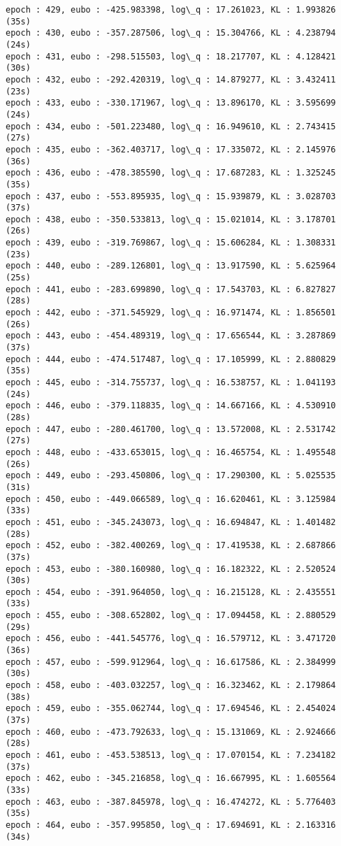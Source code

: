 \documentclass[11pt]{article}
\begin{document}
\begin{Verbatim}[commandchars=\\\{\}]
epoch : 429, eubo : -425.983398, log\_q : 17.261023, KL : 1.993826 (35s)
epoch : 430, eubo : -357.287506, log\_q : 15.304766, KL : 4.238794 (24s)
epoch : 431, eubo : -298.515503, log\_q : 18.217707, KL : 4.128421 (30s)
epoch : 432, eubo : -292.420319, log\_q : 14.879277, KL : 3.432411 (23s)
epoch : 433, eubo : -330.171967, log\_q : 13.896170, KL : 3.595699 (24s)
epoch : 434, eubo : -501.223480, log\_q : 16.949610, KL : 2.743415 (27s)
epoch : 435, eubo : -362.403717, log\_q : 17.335072, KL : 2.145976 (36s)
epoch : 436, eubo : -478.385590, log\_q : 17.687283, KL : 1.325245 (35s)
epoch : 437, eubo : -553.895935, log\_q : 15.939879, KL : 3.028703 (37s)
epoch : 438, eubo : -350.533813, log\_q : 15.021014, KL : 3.178701 (26s)
epoch : 439, eubo : -319.769867, log\_q : 15.606284, KL : 1.308331 (23s)
epoch : 440, eubo : -289.126801, log\_q : 13.917590, KL : 5.625964 (25s)
epoch : 441, eubo : -283.699890, log\_q : 17.543703, KL : 6.827827 (28s)
epoch : 442, eubo : -371.545929, log\_q : 16.971474, KL : 1.856501 (26s)
epoch : 443, eubo : -454.489319, log\_q : 17.656544, KL : 3.287869 (37s)
epoch : 444, eubo : -474.517487, log\_q : 17.105999, KL : 2.880829 (35s)
epoch : 445, eubo : -314.755737, log\_q : 16.538757, KL : 1.041193 (24s)
epoch : 446, eubo : -379.118835, log\_q : 14.667166, KL : 4.530910 (28s)
epoch : 447, eubo : -280.461700, log\_q : 13.572008, KL : 2.531742 (27s)
epoch : 448, eubo : -433.653015, log\_q : 16.465754, KL : 1.495548 (26s)
epoch : 449, eubo : -293.450806, log\_q : 17.290300, KL : 5.025535 (31s)
epoch : 450, eubo : -449.066589, log\_q : 16.620461, KL : 3.125984 (33s)
epoch : 451, eubo : -345.243073, log\_q : 16.694847, KL : 1.401482 (28s)
epoch : 452, eubo : -382.400269, log\_q : 17.419538, KL : 2.687866 (37s)
epoch : 453, eubo : -380.160980, log\_q : 16.182322, KL : 2.520524 (30s)
epoch : 454, eubo : -391.964050, log\_q : 16.215128, KL : 2.435551 (33s)
epoch : 455, eubo : -308.652802, log\_q : 17.094458, KL : 2.880529 (29s)
epoch : 456, eubo : -441.545776, log\_q : 16.579712, KL : 3.471720 (36s)
epoch : 457, eubo : -599.912964, log\_q : 16.617586, KL : 2.384999 (30s)
epoch : 458, eubo : -403.032257, log\_q : 16.323462, KL : 2.179864 (38s)
epoch : 459, eubo : -355.062744, log\_q : 17.694546, KL : 2.454024 (37s)
epoch : 460, eubo : -473.792633, log\_q : 15.131069, KL : 2.924666 (28s)
epoch : 461, eubo : -453.538513, log\_q : 17.070154, KL : 7.234182 (37s)
epoch : 462, eubo : -345.216858, log\_q : 16.667995, KL : 1.605564 (33s)
epoch : 463, eubo : -387.845978, log\_q : 16.474272, KL : 5.776403 (35s)
epoch : 464, eubo : -357.995850, log\_q : 17.694691, KL : 2.163316 (34s)

\end{Verbatim}
\end{document}
